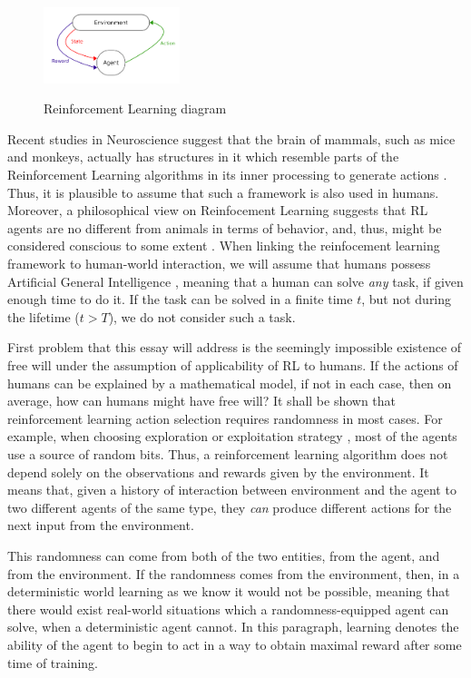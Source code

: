 \documentclass[a4paper]{article}
\begin{document}
\begin{figure}[h]
	\caption{Reinforcement Learning diagram}
	\centering \includegraphics[width=150px]{RL.png}
	\label{RL}
\end{figure}

Recent studies in Neuroscience suggest that the brain of mammals, such as mice and monkeys, actually has structures in it which resemble parts of the Reinforcement Learning algorithms in its inner processing to generate actions \cite{doyareward, doya2}. Thus, it is plausible to assume that such a framework is also used in humans. Moreover, a philosophical view on Reinfocement Learning suggests that RL agents are no different from animals in terms of behavior, and, thus, might be considered conscious to some extent \cite{rlmorality1, rlmorality2}. When linking the reinfocement learning framework to human-world interaction, we will assume that humans possess Artificial General Intelligence \cite{shane}, meaning that a human can solve {\em any} task, if given enough time to do it. If the task can be solved in a finite time $t$, but not during the lifetime ($t>T$), we do not consider such a task.

First problem that this essay will address is the seemingly impossible existence of free will under the assumption of applicability of RL to humans. If the actions of humans can be explained by a mathematical model, if not in each case, then on average, how can humans might have free will? It shall be shown that reinforcement learning action selection requires randomness in most cases. For example, when choosing exploration or exploitation strategy \cite{sutton}, most of the agents use a source of random bits. Thus, a reinforcement learning algorithm does not depend solely on the observations and rewards given by the environment. It means that, given a history of interaction between environment and the agent to two different agents of the same type, they {\em can} produce different actions for the next input from the environment.

This randomness can come from both of the two entities, from the agent, and from the environment. If the randomness comes from the environment, then, in a deterministic world learning as we know it would not be possible, meaning that there would exist real-world situations which a randomness-equipped agent can solve, when a deterministic agent cannot. In this paragraph, learning denotes the ability of the agent to begin to act in a way to obtain maximal reward after some time of training.
\end{document}
